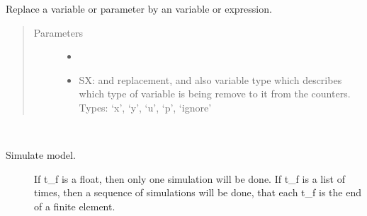 \documentclass[letterpaper,10pt,english]{sphinxmanual}
\begin{document}
\begin{fulllineitems}

\begin{fulllineitems}
\label{\detokenize{yaocptool.modelling:yaocptool.modelling.system_model.SystemModel.remove_theta}}
\end{fulllineitems}


\begin{fulllineitems}
\label{\detokenize{yaocptool.modelling:yaocptool.modelling.system_model.SystemModel.replace_variable}}
Replace a variable or parameter by an variable or expression.
\begin{quote}\begin{description}
\item[{Parameters}] \leavevmode\begin{itemize}
\item {} 
 \textendash{} 

\item {} 
 \textendash{} SX: and replacement, and also variable type which
describes which type of variable is being remove to it from the
counters. Types: ‘x’, ‘y’, ‘u’, ‘p’, ‘ignore’

\end{itemize}

\end{description}\end{quote}

\end{fulllineitems}


\begin{fulllineitems}
\label{\detokenize{yaocptool.modelling:yaocptool.modelling.system_model.SystemModel.simulate}}~\begin{description}
\item[{Simulate model.}] \leavevmode
If t\_f is a float, then only one simulation will be done. If t\_f is a list of times, then a sequence of
simulations will be done, that each t\_f is the end of a finite element.


\end{description}
\end{fulllineitems}
\end{fulllineitems}
\end{document}
